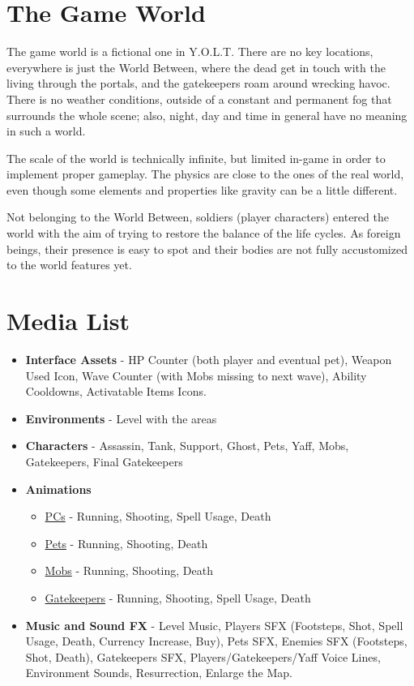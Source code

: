\documentclass[12pt]{article}
\begin{document}
\newpage

\section{The Game World}

The game world is a fictional one in Y.O.L.T. There are no key locations, everywhere is just the World Between, where the dead get in touch with the living through the portals, and the gatekeepers roam around wrecking havoc. There is no weather conditions, outside of a constant and permanent fog that surrounds the whole scene; also, night, day and time in general have no meaning in such a world.

The scale of the world is technically infinite, but limited in-game in order to implement proper gameplay. The physics are close to the ones of the real world, even though some elements and properties like gravity can be a little different.

Not belonging to the World Between, soldiers (player characters) entered the world with the aim of trying to restore the balance of the life cycles. As foreign beings, their presence is easy to spot and their bodies are not fully accustomized to the world features yet.

\newpage

\section{Media List}

\begin{itemize}
	\item \textbf{Interface Assets} - HP Counter (both player and eventual pet), Weapon Used Icon, Wave Counter (with Mobs missing to next wave), Ability Cooldowns, Activatable Items Icons.
	\item \textbf{Environments} - Level with the areas
	\item \textbf{Characters} - Assassin, Tank, Support, Ghost, Pets, Yaff, Mobs, Gatekeepers, Final Gatekeepers
	\item \textbf{Animations}
	\begin{itemize}
		\item \underline{PCs} - Running, Shooting, Spell Usage, Death
		\item \underline{Pets} - Running, Shooting, Death
		\item \underline{Mobs} - Running, Shooting, Death
		\item \underline{Gatekeepers} - Running, Shooting, Spell Usage, Death
	\end{itemize}
	\item \textbf{Music and Sound FX} - Level Music, Players SFX (Footsteps, Shot, Spell Usage, Death, Currency Increase, Buy), Pets SFX, Enemies SFX (Footsteps, Shot, Death), Gatekeepers SFX, Players/Gatekeepers/Yaff Voice Lines, Environment Sounds, Resurrection, Enlarge the Map.
\end{itemize}
\end{document}
